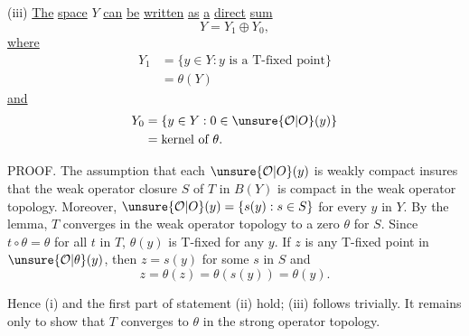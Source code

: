 (iii) \uline{The} \uline{space} $Y$ \uline{can} \uline{be} \uline{written} \uline{as} \uline{a} \uline{direct} \uline{sum}
\[
Y=Y_1\oplus Y_0,
\]
\uline{where}
\[
\begin{aligned}
Y_1&=\{y\in Y:y\text{ is a T-fixed point}\}\\
&=\theta(Y)
\end{aligned}
\]
\uline{and}
\[
\begin{aligned}
Y_0&=\{y\in Y:0\in\unsure{\mathcal O|O}(y)\}\\
&=\text{kernel of }\theta.
\end{aligned}
\]

PROOF. The assumption that each $\unsure{\mathcal O|O}(y)$ is weakly compact insures that the weak operator closure $S$ of $T$ in $B(Y)$ is compact in the weak operator topology. Moreover, $\unsure{\mathcal O|O}(y)=\{s(y):s\in S\}$ for every $y$ in $Y$. By the lemma, $T$ converges in the weak operator topology to a zero $\theta$ for $S$. Since $t\circ\theta=\theta$ for all $t$ in $T$, $\theta(y)$ is T-fixed for any $y$. If $z$ is any T-fixed point in $\unsure{\mathcal O|\theta}(y)$, then $z=s(y)$ for some $s$ in $S$ and
\[
z=\theta(z)=\theta(s(y))=\theta(y).
\]
\margin{\unsure{;}}

Hence (i) and the first part of statement (ii) hold; (iii) follows trivially. It remains only to show that $T$ converges to $\theta$ in the strong operator topology.
